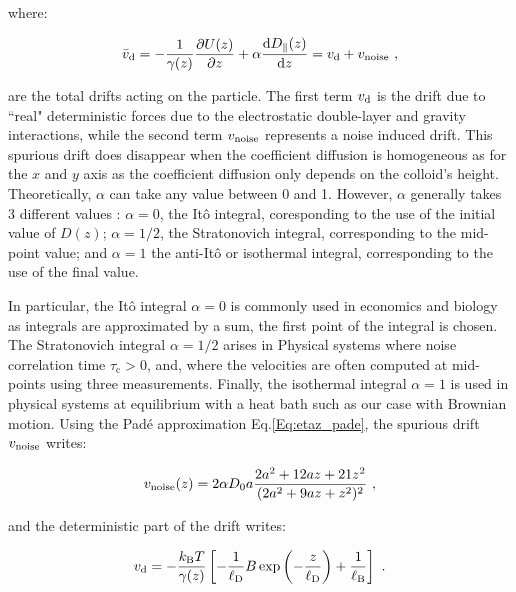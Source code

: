 where:

\begin{equation}
	\bar{v}_\textnormal{d} = - \frac{1}{\gamma(z)}\frac{\partial U(z)}{\partial z} +  \alpha  \frac{\textnormal{d} D_\parallel(z)}{\textnormal{d}z}  = v_\textnormal{d} + v_\textnormal{noise}~,
	\label{Eq.total_drifts}
\end{equation}

are the total drifts acting on the particle. The first term $v_\textnormal{d}$ is the drift  due to ``real" deterministic forces due to the electrostatic double-layer and gravity interactions, while the second term $ v_\textnormal{noise}$ represents a noise induced drift. This spurious drift does disappear when the coefficient diffusion is homogeneous as for the $x$ and $y$ axis as the coefficient diffusion only depends on the colloid's height. Theoretically, $\alpha$ can take any value between 0 and 1. However, $\alpha$ generally takes 3 different values \cite{volpe_effective_2016}:  $\alpha = 0$, the Itô integral, coresponding to the use of the initial value of $D(z)$; $\alpha = 1/2$, the Stratonovich integral, corresponding to the mid-point value; and $\alpha = 1$ the anti-Itô or isothermal integral, corresponding to the use of the final value. 

In particular, the Itô integral $\alpha = 0$ is commonly used in economics and biology as integrals are approximated by a sum, the first point of the integral is chosen.  The Stratonovich integral $\alpha = 1/2$ arises in Physical systems where noise correlation time $\tau _\mathrm{c} > 0$, and, where the velocities are often computed at mid-points using three measurements. Finally, the isothermal integral $\alpha = 1$ is used in physical systems at equilibrium with a heat bath \cite{volpe_influence_2010} such as our case with Brownian motion. Using the Padé approximation Eq.\ref{Eq:etaz_pade}, the spurious drift $v_\textnormal{noise}$ writes:

\begin{equation}
	v_\textnormal{noise} (z)= 2 \alpha D_0 a\frac{2a^2 + 12 az + 21 z^2}{(2 a^2 + 9az + z^2) ^2} ~,
	\label{Eq.spurious_drift}
\end{equation}

and the deterministic part of the drift writes:

\begin{equation}
	v_\textnormal{d} =- \frac{k_\mathrm{B}T}{\gamma(z)} \left[- \frac{1}{\ell_\mathrm{D}} B \exp \left(- \frac{z}{\ell_\mathrm{D}}\right) + \frac{1}{\ell_\mathrm{B}}\right] ~.
\end{equation}

